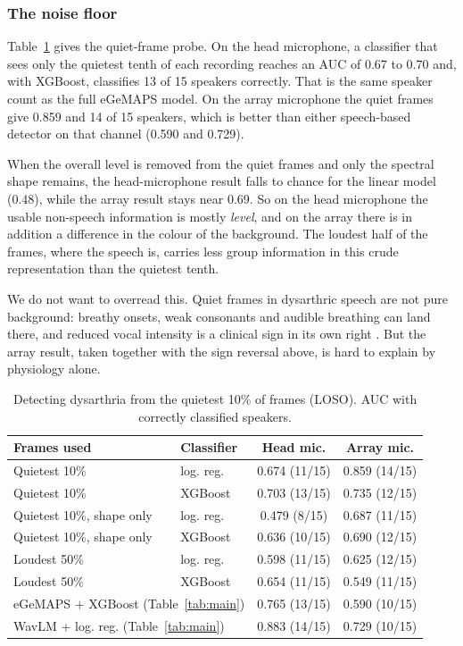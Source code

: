 \documentclass[conference]{IEEEtran}
\begin{document}
\subsubsection{The noise floor}
Table~\ref{tab:quiet} gives the quiet-frame probe. On the head microphone, a classifier that sees only the quietest tenth of each recording reaches an AUC of 0.67 to 0.70 and, with XGBoost, classifies 13 of 15 speakers correctly. That is the same speaker count as the full eGeMAPS model. On the array microphone the quiet frames give 0.859 and 14 of 15 speakers, which is better than either speech-based detector on that channel (0.590 and 0.729).

When the overall level is removed from the quiet frames and only the spectral shape remains, the head-microphone result falls to chance for the linear model (0.48), while the array result stays near 0.69. So on the head microphone the usable non-speech information is mostly \emph{level}, and on the array there is in addition a difference in the colour of the background. The loudest half of the frames, where the speech is, carries less group information in this crude representation than the quietest tenth.

We do not want to overread this. Quiet frames in dysarthric speech are not pure background: breathy onsets, weak consonants and audible breathing can land there, and reduced vocal intensity is a clinical sign in its own right \cite{duffy2020}. But the array result, taken together with the sign reversal above, is hard to explain by physiology alone.

\begin{table}[t]
\caption{Detecting dysarthria from the quietest 10\% of frames (LOSO). AUC with correctly classified speakers.}
\label{tab:quiet}
\centering
\setlength{\tabcolsep}{4pt}
\begin{tabular}{llcc}
\toprule
Frames used & Classifier & Head mic. & Array mic.\\
\midrule
Quietest 10\% & log. reg. & 0.674 (11/15) & 0.859 (14/15)\\
Quietest 10\% & XGBoost & 0.703 (13/15) & 0.735 (12/15)\\
Quietest 10\%, shape only & log. reg. & 0.479 (8/15) & 0.687 (11/15)\\
Quietest 10\%, shape only & XGBoost & 0.636 (10/15) & 0.690 (12/15)\\
Loudest 50\% & log. reg. & 0.598 (11/15) & 0.625 (12/15)\\
Loudest 50\% & XGBoost & 0.654 (11/15) & 0.549 (11/15)\\
\midrule
\multicolumn{2}{l}{eGeMAPS + XGBoost (Table~\ref{tab:main})} & 0.765 (13/15) & 0.590 (10/15)\\
\multicolumn{2}{l}{WavLM + log. reg. (Table~\ref{tab:main})} & 0.883 (14/15) & 0.729 (10/15)\\
\bottomrule
\end{tabular}
\end{table}
\end{document}

